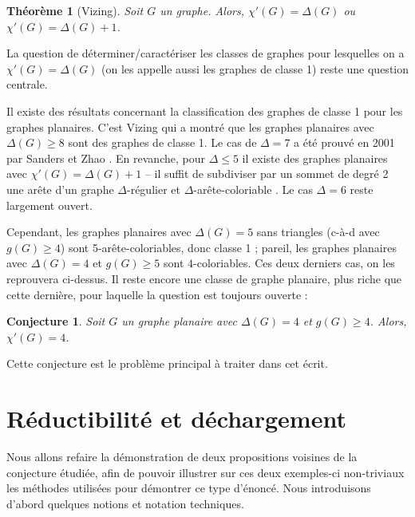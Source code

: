 \documentclass[10pt,a4paper]{article}
\newtheorem{theorem}{Théorème}
\newtheorem{conjecture}{Conjecture}
\begin{document}
\begin{theorem}[Vizing]
Soit $G$ un graphe. Alors, $\chi'(G) = \Delta(G)$ ou $\chi'(G) = \Delta(G) + 1$.
\end{theorem}

La question de déterminer/caractériser les classes de graphes pour lesquelles on a $\chi'(G) = \Delta(G)$ (on les appelle aussi les graphes de classe 1) reste une question centrale. 

Il existe des résultats concernant la classification des graphes de classe 1 pour les graphes planaires.
C'est Vizing \cite{Vizing} qui a montré que les graphes planaires avec $\Delta(G)\ge 8$ sont des graphes de classe 1. Le cas de $\Delta = 7$ a été prouvé en 2001 par Sanders et Zhao \cite{SandersZhao}. 
En revanche, pour $\Delta\le 5$ il existe des graphes planaires avec $\chi'(G)=\Delta(G)+1$ -- il suffit de subdiviser par un sommet de degré 2 une arête d'un graphe $\Delta$-régulier et $\Delta$-arête-coloriable \cite{Vizing2}.
Le cas $\Delta = 6$ reste largement ouvert. 

Cependant, les graphes planaires avec $\Delta(G)=5$ sans triangles (c-à-d avec $g(G)\ge 4$) sont 5-arête-coloriables, donc classe 1 ; pareil, les graphes planaires avec $\Delta(G) = 4$ et $g(G)\ge 5$ sont $4$-coloriables. Ces deux derniers cas, on les reprouvera ci-dessus. Il reste encore une classe de graphe planaire, plus riche que cette dernière, pour laquelle la question est toujours ouverte :

\begin{conjecture}
Soit $G$ un graphe planaire avec $\Delta(G) = 4$ et $g(G) \geq 4$. Alors, $\chi'(G) = 4$. 
\end{conjecture} 

Cette conjecture est le problème principal à traiter dans cet écrit. 

\section{Réductibilité et déchargement}
\label{chap:easy}

Nous allons refaire la démonstration de deux propositions voisines de la conjecture étudiée, afin de pouvoir illustrer sur ces deux exemples-ci non-triviaux les méthodes utilisées pour démontrer ce type d'énoncé. Nous introduisons d'abord quelques notions et notation techniques.
\end{document}
